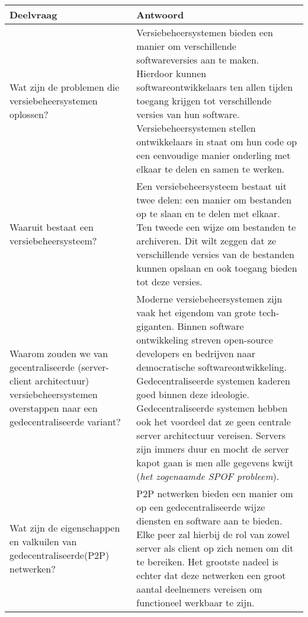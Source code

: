 \begin{table}[h!]
\begin{tabularx}{\linewidth}{ |X|X| }
\hline
Deelvraag & Antwoord \\ \hline
Wat zijn de problemen die versiebeheersystemen oplossen? & 
Versiebeheersystemen bieden een manier om verschillende softwareversies aan te maken. Hierdoor kunnen softwareontwikkelaars ten allen tijden toegang krijgen tot verschillende versies van hun software. Versiebeheersystemen stellen ontwikkelaars in staat om hun code op een eenvoudige manier onderling met elkaar te delen en samen te werken.\\ \hline
Waaruit bestaat een versiebeheersysteem? & Een versiebeheersysteem bestaat uit twee delen: een manier om bestanden op te slaan en te delen met elkaar. Ten tweede een wijze om bestanden te archiveren. Dit wilt zeggen dat ze verschillende versies van de bestanden kunnen opslaan en ook toegang bieden tot deze versies.\\ \hline
Waarom zouden we van gecentraliseerde (server-client architectuur) versiebeheersystemen overstappen naar een gedecentraliseerde variant?         & Moderne versiebeheersystemen zijn vaak het eigendom van grote tech-giganten. Binnen software ontwikkeling streven open-source developers en bedrijven naar democratische softwareontwikkeling. Gedecentraliseerde systemen kaderen goed binnen deze ideologie. Gedecentraliseerde systemen hebben ook het voordeel dat ze geen centrale server architectuur vereisen. Servers zijn immers duur en mocht de server kapot gaan is men alle gegevens kwijt (\textit{het zogenaamde SPOF probleem}).\\ \hline
Wat zijn de eigenschappen en valkuilen van gedecentraliseerde(P2P) netwerken? & P2P netwerken bieden een manier om op een gedecentraliseerde wijze diensten en software aan te bieden. Elke peer zal hierbij de rol van zowel server als client op zich nemen om dit te bereiken. Het grootste nadeel is echter dat deze netwerken een groot aantal deelnemers vereisen om functioneel werkbaar te zijn.\\ \hline
\end{tabularx}
\end{table} 
\newpage
